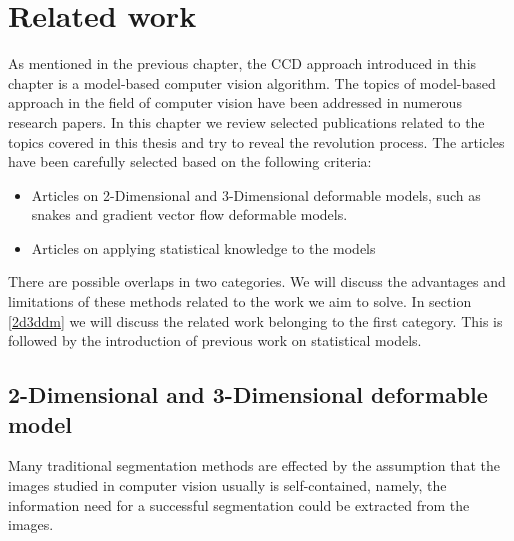 \chapter{Related work}
\label{chapter:related}

As mentioned in the previous chapter, the
CCD approach introduced in this chapter is a model-based computer
vision algorithm. The topics of model-based approach in the field of
computer vision have been addressed in numerous research papers.
In this chapter we review selected publications related to the topics
covered in this thesis and try to reveal the revolution process. The
articles have been carefully selected based on the following criteria:
\begin{itemize}
\item Articles on 2-Dimensional and 3-Dimensional deformable models,
  such as snakes and gradient vector flow deformable models\cite{xu2000gradient}.
\item Articles on applying statistical knowledge to the models
\end{itemize}
There are possible overlaps in two categories. We will discuss the
advantages and limitations of these methods related to the work we aim
to solve. In section \ref{2d3ddm} we will discuss the related work
belonging to the first category. This is followed by the introduction
of previous work on statistical models.

\section{2-Dimensional and 3-Dimensional deformable model}
\label{sec:2d3ddm}
Many traditional segmentation methods are effected by the assumption that the
images studied in computer vision usually is self-contained, namely,
the information need for a successful segmentation could be extracted
from the images.

